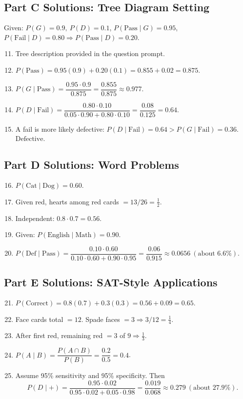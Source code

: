 \documentclass[12pt]{article}
\begin{document}
\subsection*{Part C Solutions: Tree Diagram Setting}
Given: \(P(G)=0.9,\ P(D)=0.1\), \(P(\text{Pass}\mid G)=0.95\), \(P(\text{Fail}\mid D)=0.80\Rightarrow P(\text{Pass}\mid D)=0.20\).
\begin{enumerate}
  \setcounter{enumi}{10}
  \item Tree description provided in the question prompt.
  \item \(P(\text{Pass})=0.95(0.9)+0.20(0.1)=0.855+0.02=\boxed{0.875}\).
  \item \(P(G\mid \text{Pass})=\dfrac{0.95\cdot0.9}{0.875}=\dfrac{0.855}{0.875}\approx\boxed{0.977}\).
  \item \(P(D\mid \text{Fail})=\dfrac{0.80\cdot0.10}{0.05\cdot0.90+0.80\cdot0.10}=\dfrac{0.08}{0.125}=\boxed{0.64}\).
  \item A fail is more likely defective: \(P(D\mid \text{Fail})=0.64 > P(G\mid \text{Fail})=0.36\). \(\boxed{\text{Defective}}\).
\end{enumerate}

\subsection*{Part D Solutions: Word Problems}
\begin{enumerate}
  \setcounter{enumi}{15}
  \item \(P(\text{Cat}\mid \text{Dog})=\boxed{0.60}\).
  \item Given red, hearts among red cards \(=13/26=\boxed{\tfrac{1}{2}}\).
  \item Independent: \(0.8\cdot0.7=\boxed{0.56}\).
  \item Given: \(P(\text{English}\mid \text{Math})=\boxed{0.90}\).
  \item \(P(\text{Def}\mid \text{Pass})=\dfrac{0.10\cdot0.60}{0.10\cdot0.60+0.90\cdot0.95}
  =\dfrac{0.06}{0.915}\approx\boxed{0.0656}\ (\text{about }6.6\%)\).
\end{enumerate}

\subsection*{Part E Solutions: SAT-Style Applications}
\begin{enumerate}
  \setcounter{enumi}{20}
  \item \(P(\text{Correct})=0.8(0.7)+0.3(0.3)=0.56+0.09=\boxed{0.65}\).
  \item Face cards total \(=12\). Spade faces \(=3\Rightarrow 3/12=\boxed{\tfrac{1}{4}}\).
  \item After first red, remaining red \(=3\) of \(9\Rightarrow \boxed{\tfrac{1}{3}}\).
  \item \(P(A\mid B)=\dfrac{P(A\cap B)}{P(B)}=\dfrac{0.2}{0.5}=\boxed{0.4}\).
  \item Assume 95\% sensitivity and 95\% specificity. Then
  \[
  P(D\mid +)=\frac{0.95\cdot0.02}{0.95\cdot0.02+0.05\cdot0.98}
  =\frac{0.019}{0.068}\approx\boxed{0.279}\ (\text{about }27.9\%).
  \]
\end{enumerate}
\end{document}
